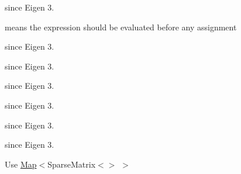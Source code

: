 \begin{DoxyRefList}
%
since Eigen 3.  
\item[Member \mbox{\hyperlink{group__flags_ga0972b20dc004d13984e642b3bd12532e}{Eigen::Eval\+Before\+Assigning\+Bit}} ]\label{deprecated__deprecated000012}%
%
 means the expression should be evaluated before any assignment  
\item[Member \mbox{\hyperlink{class_eigen_1_1_generalized_eigen_solver_a46a0ff3841059479ec314e56a5645302}{Eigen::Generalized\+Eigen\+Solver$<$ \+\_\+\+Matrix\+Type $>$::Index}} ]\label{deprecated__deprecated000019}%
%
since Eigen 3.  
\item[Member \mbox{\hyperlink{class_eigen_1_1_hessenberg_decomposition_a8e287ac222f53e2c8ce82faa43e95ac6}{Eigen::Hessenberg\+Decomposition$<$ \+\_\+\+Matrix\+Type $>$::Index}} ]\label{deprecated__deprecated000020}%
%
since Eigen 3.  
\item[Member \mbox{\hyperlink{class_eigen_1_1_hyperplane_a58d2307d16128a0026021374e9e10465}{Eigen::Hyperplane$<$ \+\_\+\+Scalar, \+\_\+\+Ambient\+Dim, \+\_\+\+Options $>$::Index}} ]\label{deprecated__deprecated000028}%
%
since Eigen 3.  
\item[Member \mbox{\hyperlink{class_eigen_1_1internal_1_1_upper_bidiagonalization_adcb14f3919a3dcc9977ba6b8105087fe}{Eigen::internal::Upper\+Bidiagonalization$<$ \+\_\+\+Matrix\+Type $>$::Index}} ]\label{deprecated__deprecated000039}%
%
since Eigen 3.  
\item[Member \mbox{\hyperlink{class_eigen_1_1_l_d_l_t_ad9c57eb2fb3bbccd51b9d2e111bea355}{Eigen::L\+D\+LT$<$ \+\_\+\+Matrix\+Type, \+\_\+\+Up\+Lo $>$::Index}} ]\label{deprecated__deprecated000001}%
%
since Eigen 3.  
\item[Member \mbox{\hyperlink{class_eigen_1_1_l_l_t_ac7a64274814fa76e8b1e9e945546037f}{Eigen::L\+LT$<$ \+\_\+\+Matrix\+Type, \+\_\+\+Up\+Lo $>$::Index}} ]\label{deprecated__deprecated000002}%
%
since Eigen 3.  
\item[\mbox{\hyperlink{struct_class}{Class}} \mbox{\hyperlink{class_eigen_1_1_mapped_sparse_matrix}{Eigen::Mapped\+Sparse\+Matrix$<$ \+\_\+\+Scalar, \+\_\+\+Flags, \+\_\+\+Storage\+Index $>$}} ]\label{deprecated__deprecated000037}%
%
Use \mbox{\hyperlink{class_eigen_1_1_map}{Map}}$<$Sparse\+Matrix$<$$>$ $>$



\end{DoxyRefList}
